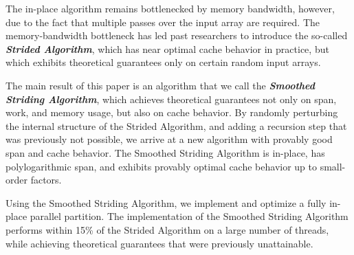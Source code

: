 \documentclass[journal, onecolumn]{IEEEtran}
\newcommand{\defn}[1]       {{\textit{\textbf{\boldmath #1}}}}
\begin{document}
The in-place algorithm remains bottlenecked by memory bandwidth,
however, due to the fact that multiple passes over the input array are
required. The memory-bandwidth bottleneck has led past researchers
\cite{FrancisPa92, Frias08} to introduce the so-called \defn{Strided
  Algorithm}, which has near optimal cache behavior in practice, but
which exhibits theoretical guarantees only on certain random input
arrays.

The main result of this paper is an algorithm that we call the
\defn{Smoothed Striding Algorithm}, which achieves theoretical
guarantees not only on span, work, and memory usage, but also on cache
behavior. By randomly perturbing the internal structure of the Strided
Algorithm, and adding a recursion step that was previously not
possible, we arrive at a new algorithm with provably good span and
cache behavior. The Smoothed Striding Algorithm is in-place, has
polylogarithmic span, and exhibits provably optimal cache behavior up
to small-order factors.

Using the Smoothed Striding Algorithm, we implement and optimize a
fully in-place parallel partition. The implementation of the Smoothed
Striding Algorithm performs within 15\% of the Strided Algorithm on a
large number of threads, while achieving theoretical guarantees that
were previously unattainable.

{}

\end{document}
